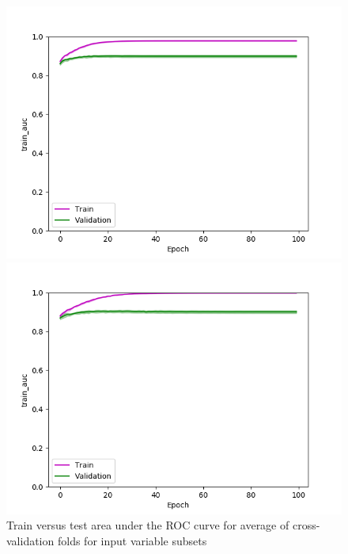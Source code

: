 \def\year{2017}\relax \documentclass[letterpaper]{article}
\begin{document}
\begin{figure}
\begin{minipage}{.24\textwidth}
  \centering
\includegraphics[width=\textwidth]{pics/d3_train_auc_mean_train_test.png}
\caption{$D_3$}\label{fig:d3acctraintest}
\end{minipage}
\begin{minipage}{.01\textwidth}
\end{minipage}
\begin{minipage}{.24\textwidth}
  \centering
\includegraphics[width=\textwidth]{pics/d4_train_auc_mean_train_test.png}
\caption{$D_4$}\label{fig:d4acctraintest}
\end{minipage}
\caption{Train versus test area under the ROC curve for average of cross-validation folds for input variable subsets}\label{fig:traintestauc}
\end{figure}
\end{document}

